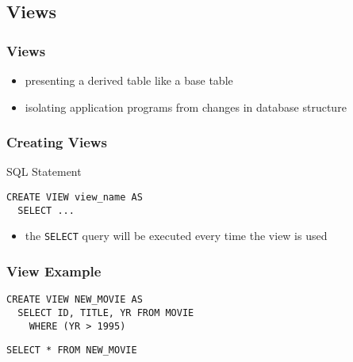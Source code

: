 \documentclass[dvipsnames]{beamer}
\theoremstyle{plain}
\begin{document}
\subsection{Views}

\begin{frame}
  \frametitle{Views}

  \begin{itemize}
    \item presenting a derived table like a base table

    \pause
    \item isolating application programs from changes in database structure
  \end{itemize}
\end{frame}

\begin{frame}[fragile]
  \frametitle{Creating Views}

  \begin{block}{SQL Statement}
    \begin{lstlisting}[language=ExtendedSQL]
CREATE VIEW view_name AS
  SELECT ...
    \end{lstlisting}
  \end{block}

  \pause
  \begin{itemize}
    \item the \lstinline!SELECT! query will be executed every time the view is
      used
  \end{itemize}
\end{frame}

\begin{frame}[fragile]
  \frametitle{View Example}

  \begin{example}
    \begin{lstlisting}[language=ExtendedSQL]
CREATE VIEW NEW_MOVIE AS
  SELECT ID, TITLE, YR FROM MOVIE
    WHERE (YR > 1995)
    \end{lstlisting}

    \pause
    \begin{lstlisting}[language=ExtendedSQL]
SELECT * FROM NEW_MOVIE
    \end{lstlisting}
  \end{example}
\end{frame}
\end{document}
